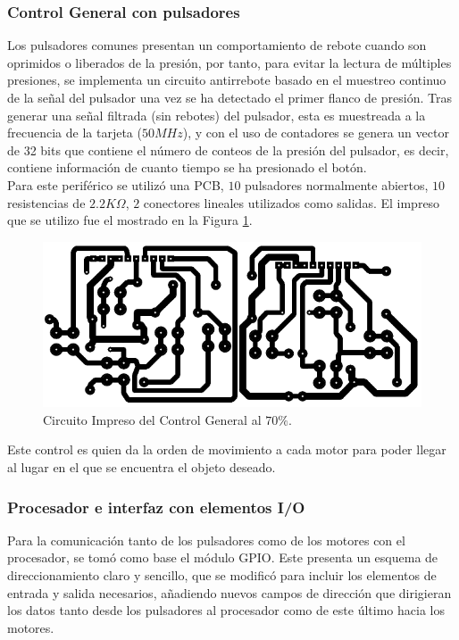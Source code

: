 \documentclass[twocolumn]{IEEEtran}
\begin{document}
\subsubsection{Control General con pulsadores}
\noindent
Los pulsadores comunes presentan un comportamiento de rebote cuando son oprimidos o liberados de la presión, por tanto, para evitar la lectura de múltiples presiones, se implementa un circuito antirrebote basado en el muestreo continuo de la señal del pulsador una vez se ha detectado el primer flanco de presión. Tras generar una señal filtrada (sin rebotes) del pulsador, esta es muestreada a la frecuencia de la tarjeta ($50MHz$), y con el uso de contadores se genera un vector de 32 bits que contiene el número de conteos de la presión del pulsador, es decir, contiene información de cuanto tiempo se ha presionado el botón.\\
Para este periférico se utilizó una PCB, $10$ pulsadores normalmente abiertos, $10$ resistencias de $2.2K \Omega$, $2$ conectores lineales utilizados como salidas. El impreso que se utilizo fue el mostrado en la Figura \ref{fig1}.\\
\begin{figure}[]
	\centering
		\includegraphics[scale=0.7]{Control_1_3.PDF}
	\caption{Circuito Impreso del Control General al $70\%$.}
	\label{fig1}
\end{figure}
\noindent
Este control es quien da la orden de movimiento a cada motor para poder llegar al lugar en el que se encuentra el objeto deseado.


\subsubsection{Procesador e interfaz con elementos I/O}
\noindent
Para la comunicación tanto de los pulsadores como de los motores con el procesador, se tomó como base el módulo GPIO. Este presenta un esquema de direccionamiento claro y sencillo, que se modificó para incluir los elementos de entrada y salida necesarios, añadiendo nuevos campos de dirección que dirigieran los datos tanto desde los pulsadores al procesador como de este último hacia los motores.
\end{document}
